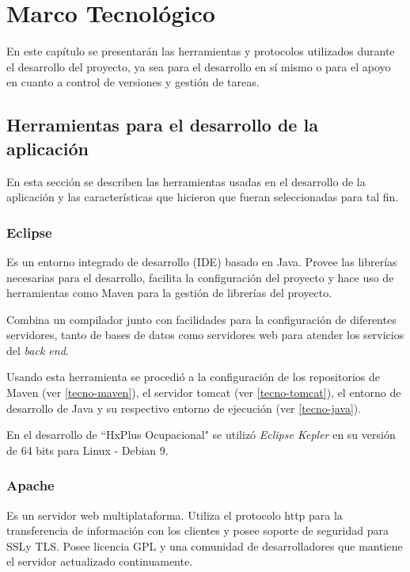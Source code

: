 \chapter{Marco Tecnológico}

En este capítulo se presentarán las herramientas y protocolos utilizados durante el desarrollo del proyecto, ya sea para el desarrollo en sí mismo o para el apoyo en cuanto a control de versiones y gestión de tareas.

    \section{Herramientas para el desarrollo de la aplicación}
    
    En esta sección se describen las herramientas usadas en el desarrollo de la aplicación y las características que hicieron que fueran seleccionadas para tal fin.
    
        \subsection{Eclipse}
        \label{tecno-eclipse}
        
        Es un entorno integrado de desarrollo (IDE) basado en Java. Provee las librerías necesarias para el desarrollo, facilita la configuración del proyecto y hace uso de herramientas como Maven para la gestión de librerías del proyecto.
        
        Combina un compilador junto con facilidades para la configuración de diferentes servidores, tanto de bases de datos como servidores web para atender los servicios del \textit{back end}.
        
        Usando esta herramienta se procedió a la configuración de los repositorios de Maven (ver \ref{tecno-maven}), el servidor tomcat (ver \ref{tecno-tomcat}), el entorno de desarrollo de Java y su respectivo entorno de ejecución (ver \ref{tecno-java}).
        
        En el desarrollo de ``HxPlus Ocupacional" se utilizó \textit{Eclipse Kepler} en su versión de 64 bits para Linux - Debian 9.
        
        \subsection{Apache}
        \label{tecno-apache}
        
        Es un servidor web multiplataforma. Utiliza el protocolo http para la transferencia de información con los clientes y posee soporte de seguridad para SSLy TLS\cite{APACHE-culturacion}. Posee licencia GPL y una comunidad de desarrolladores que mantiene el servidor actualizado continuamente.
        
